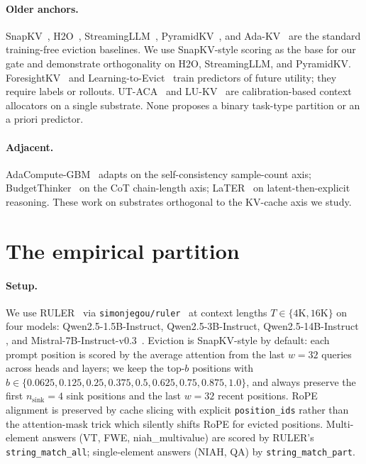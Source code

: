 \documentclass{article}
\begin{document}
\paragraph{Older anchors.}
SnapKV~\citep{arxiv240414469}, H2O~\citep{arxiv230614048},
StreamingLLM~\citep{arxiv230917453}, PyramidKV~\citep{arxiv240602069}, and
Ada-KV~\citep{arxiv240711550} are the standard
training-free eviction baselines. We use SnapKV-style scoring as the base for
our gate and demonstrate orthogonality on H2O, StreamingLLM, and PyramidKV.
ForesightKV~\citep{arxiv260203203} and Learning-to-Evict~\citep{arxiv260210238}
train predictors of future utility; they require labels or rollouts. UT-ACA~%
\citep{arxiv260318446} and LU-KV~\citep{arxiv260208585} are calibration-based
context allocators on a single substrate. None proposes a binary task-type
partition or an a priori predictor.

\paragraph{Adjacent.}
AdaCompute-GBM~\citep{arxiv260414853} adapts on the self-consistency sample-count
axis; BudgetThinker~\citep{arxiv250817196} on the CoT chain-length axis;
LaTER~\citep{arxiv260507315} on latent-then-explicit reasoning. These work on
substrates orthogonal to the KV-cache axis we study.

\section{The empirical partition}
\label{sec:partition}

\paragraph{Setup.} We use RULER~\citep{arxiv240406654} via
\texttt{simonjegou/ruler}~\citep{ruler-hf} at context lengths
$T \in \{4\mathrm{K}, 16\mathrm{K}\}$
on four models: Qwen2.5-1.5B-Instruct, Qwen2.5-3B-Instruct, Qwen2.5-14B-Instruct
\citep{arxiv241215115}, and Mistral-7B-Instruct-v0.3~\citep{arxiv231006825}. Eviction is SnapKV-style by default: each prompt
position is scored by the average attention from the last $w = 32$ queries across
heads and layers; we keep the top-$b$ positions with $b \in
\{0.0625, 0.125, 0.25, 0.375, 0.5, 0.625, 0.75, 0.875, 1.0\}$, and always
preserve the first $n_{\text{sink}} = 4$ sink positions and the last $w = 32$
recent positions. RoPE alignment is preserved by cache slicing with explicit
\texttt{position\_ids} rather than the attention-mask trick which silently shifts
RoPE for evicted positions. Multi-element answers (VT, FWE, niah\_multivalue)
are scored by RULER's \texttt{string\_match\_all}; single-element answers
(NIAH, QA) by \texttt{string\_match\_part}.
\end{document}
